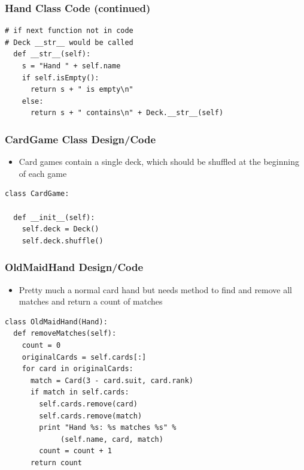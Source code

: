 \documentclass{beamer}
\newcommand\Fontvi{\fontsize{6}{6}\selectfont}
\begin{document}
\begin{frame}[fragile]
\frametitle{Hand Class Code (continued)}
\Fontvi
\begin{lstlisting}
# if next function not in code 
# Deck __str__ would be called
  def __str__(self):
    s = "Hand " + self.name
    if self.isEmpty():
      return s + " is empty\n"
    else:
      return s + " contains\n" + Deck.__str__(self)
\end{lstlisting}
\end{frame}

\begin{frame}[fragile]
\frametitle{CardGame Class Design/Code}
\Fontvi
\begin{itemize}
\item Card games contain a single deck, which should be shuffled at the beginning of each game
\end{itemize}
\begin{lstlisting}
class CardGame:

  def __init__(self):
    self.deck = Deck()
    self.deck.shuffle()
\end{lstlisting}
\end{frame}

\begin{frame}[fragile]
\frametitle{OldMaidHand Design/Code}
\Fontvi
\begin{itemize}
\item Pretty much a normal card hand but needs method to find and remove all matches and return a count of matches
\end{itemize}
\begin{lstlisting}
class OldMaidHand(Hand):
  def removeMatches(self):
    count = 0
    originalCards = self.cards[:]
    for card in originalCards:
      match = Card(3 - card.suit, card.rank)
      if match in self.cards:
        self.cards.remove(card)
        self.cards.remove(match)
        print "Hand %s: %s matches %s" % 
             (self.name, card, match)
        count = count + 1
      return count

\end{lstlisting}
\end{frame}
\end{document}
